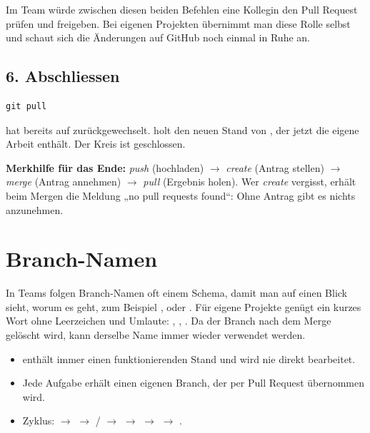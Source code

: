 Im Team würde zwischen diesen beiden Befehlen eine Kollegin den Pull Request prüfen und
freigeben. Bei eigenen Projekten übernimmt man diese Rolle selbst und schaut sich die
Änderungen auf GitHub noch einmal in Ruhe an.

\subsection*{6. Abschliessen}

\begin{lstlisting}[style=befehle]
git pull
\end{lstlisting}

 hat bereits auf  zurückgewechselt. 
holt den neuen Stand von , der jetzt die eigene Arbeit enthält. Der Kreis ist
geschlossen.

\begin{erfahrung}
\textbf{Merkhilfe für das Ende:} \emph{push} (hochladen) $\rightarrow$ \emph{create}
(Antrag stellen) $\rightarrow$ \emph{merge} (Antrag annehmen) $\rightarrow$ \emph{pull}
(Ergebnis holen). Wer \emph{create} vergisst, erhält beim Mergen die Meldung
„no pull requests found“: Ohne Antrag gibt es nichts anzunehmen.
\end{erfahrung}

\section{Branch-Namen}

In Teams folgen Branch-Namen oft einem Schema, damit man auf einen Blick sieht, worum es
geht, zum Beispiel ,  oder
. Für eigene Projekte genügt ein kurzes Wort ohne Leerzeichen und
Umlaute: , , . Da der Branch nach dem Merge gelöscht wird,
kann derselbe Name immer wieder verwendet werden.

\begin{zusammenfassung}
\begin{itemize}[nosep]
  \item {} enthält immer einen funktionierenden Stand und wird nie direkt bearbeitet.
  \item Jede Aufgabe erhält einen eigenen Branch, der per Pull Request übernommen wird.
  \item Zyklus:  $\rightarrow$  $\rightarrow$ /
        $\rightarrow$  $\rightarrow$  $\rightarrow$ 
        $\rightarrow$ .
\end{itemize}
\end{zusammenfassung}
